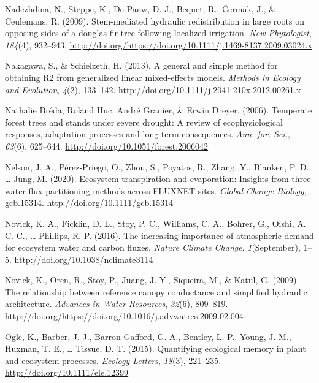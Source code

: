\documentclass[11pt,twoside]{reedthesis}
\begin{document}
\hypertarget{ref-Nadezhdina2009}{}
Nadezhdina, N., Steppe, K., De Pauw, D. J., Bequet, R., Čermak, J., \&
Ceulemans, R. (2009). Stem-mediated hydraulic redistribution in large
roots on opposing sides of a douglas-fir tree following localized
irrigation. \emph{New Phytologist}, \emph{184}(4), 932--943.
\url{http://doi.org/https://doi.org/10.1111/j.1469-8137.2009.03024.x}

\hypertarget{ref-Nakagawa2013}{}
Nakagawa, S., \& Schielzeth, H. (2013). A general and simple method for
obtaining R2 from generalized linear mixed-effects models. \emph{Methods
in Ecology and Evolution}, \emph{4}(2), 133--142.
\url{http://doi.org/10.1111/j.2041-210x.2012.00261.x}

\hypertarget{ref-Breda2006}{}
Nathalie Bréda, Roland Huc, André Granier, \& Erwin Dreyer. (2006).
Temperate forest trees and stands under severe drought: A review of
ecophysiological responses, adaptation processes and long-term
consequences. \emph{Ann. for. Sci.}, \emph{63}(6), 625--644.
\url{http://doi.org/10.1051/forest:2006042}

\hypertarget{ref-nelson_ecosystem_2020}{}
Nelson, J. A., Pérez‐Priego, O., Zhou, S., Poyatos, R., Zhang, Y.,
Blanken, P. D., \ldots{} Jung, M. (2020). Ecosystem transpiration and
evaporation: Insights from three water flux partitioning methods across
FLUXNET sites. \emph{Global Change Biology}, gcb.15314.
\url{http://doi.org/10.1111/gcb.15314}

\hypertarget{ref-Novick2016}{}
Novick, K. A., Ficklin, D. L., Stoy, P. C., Williams, C. A., Bohrer, G.,
Oishi, A. C. C., \ldots{} Phillips, R. P. (2016). The increasing
importance of atmospheric demand for ecosystem water and carbon fluxes.
\emph{Nature Climate Change}, \emph{1}(September), 1--5.
\url{http://doi.org/10.1038/nclimate3114}

\hypertarget{ref-Novick2009}{}
Novick, K., Oren, R., Stoy, P., Juang, J.-Y., Siqueira, M., \& Katul, G.
(2009). The relationship between reference canopy conductance and
simplified hydraulic architecture. \emph{Advances in Water Resources},
\emph{32}(6), 809--819.
\url{http://doi.org/https://doi.org/10.1016/j.advwatres.2009.02.004}

\hypertarget{ref-ogle_quantifying_2015}{}
Ogle, K., Barber, J. J., Barron-Gafford, G. A., Bentley, L. P., Young,
J. M., Huxman, T. E., \ldots{} Tissue, D. T. (2015). Quantifying
ecological memory in plant and ecosystem processes. \emph{Ecology
Letters}, \emph{18}(3), 221--235. \url{http://doi.org/10.1111/ele.12399}
\end{document}
